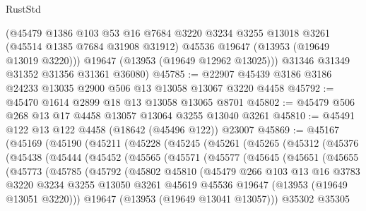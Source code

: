\begin{lexlean}{RustStd}
\begin{coremodule}
        (@45479
          @1386
          @103
          @53
          @16
          @7684
          @3220
          @3234
          @3255
          @13018
          @3261
          (@45514 @1385 @7684 @31908 @31912)
          @45536
          @19647
          (@13953 (@19649 @13019 @3220)))
        @19647
        (@13953 (@19649 @12962 @13025)))
      @31346
      @31349
      @31352
      @31356
      @31361
      @36080)
@45785 := @22907 @45439 @3186 @3186 @24233 @13035 @2900 @506 @13 @13058 @13067 @3220 @4458
@45792 := @45470 @1614 @2899 @18 @13 @13058 @13065 @8701
@45802 := @45479 @506 @268 @13 @17 @4458 @13057 @13064 @3255 @13040 @3261
@45810 := @45491 @122 @13 @122 @4458 (@18642 (@45496 @122)) @23007
@45869 := @45167
    (@45169
      (@45190
        (@45211
          (@45228
            (@45245
              (@45261
                (@45265
                  (@45312
                    (@45376
                      (@45438
                        (@45444
                          (@45452
                            (@45565
                              (@45571
                                (@45577
                                  (@45645
                                    (@45651
                                      (@45655
                                        (@45773
                                          (@45785
                                            (@45792
                                              (@45802
                                                @45810
                                                (@45479
                                                  @266
                                                  @103
                                                  @13
                                                  @16
                                                  @3783
                                                  @3220
                                                  @3234
                                                  @3255
                                                  @13050
                                                  @3261
                                                  @45619
                                                  @45536
                                                  @19647
                                                  (@13953 (@19649 @13051 @3220)))
                                                @19647
                                                (@13953 (@19649 @13041 @13057)))
                                              @35302
                                              @35305

\end{coremodule}
\end{lexlean}

